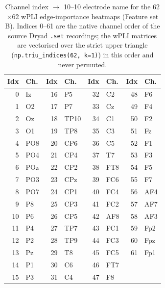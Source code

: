 \begin{table}[t]
  \centering
  \caption{Channel index $\rightarrow$ 10--10 electrode name for the 62$\times$62 wPLI
  edge-importance heatmaps (Feature set B). Indices 0--61 are the native channel order
  of the source Dryad \texttt{.set} recordings; the wPLI matrices are vectorised over the
  strict upper triangle (\texttt{np.triu\_indices(62, k=1)}) in this order and never permuted.}
  \label{tab:wpli-channel-order}
  \begin{tabular}{rlrlrlrl}
    \toprule
    \textbf{Idx} & \textbf{Ch.} & \textbf{Idx} & \textbf{Ch.} & \textbf{Idx} & \textbf{Ch.} & \textbf{Idx} & \textbf{Ch.} \\
    \midrule
    0 & Iz & 16 & P5 & 32 & C2 & 48 & F6 \\
    1 & O2 & 17 & P7 & 33 & Cz & 49 & F4 \\
    2 & Oz & 18 & TP10 & 34 & C1 & 50 & F2 \\
    3 & O1 & 19 & TP8 & 35 & C3 & 51 & Fz \\
    4 & PO8 & 20 & CP6 & 36 & C5 & 52 & F1 \\
    5 & PO4 & 21 & CP4 & 37 & T7 & 53 & F3 \\
    6 & POz & 22 & CP2 & 38 & FT8 & 54 & F5 \\
    7 & PO3 & 23 & CPz & 39 & FC6 & 55 & F7 \\
    8 & PO7 & 24 & CP1 & 40 & FC4 & 56 & AF4 \\
    9 & P8 & 25 & CP3 & 41 & FC2 & 57 & AF7 \\
    10 & P6 & 26 & CP5 & 42 & AF8 & 58 & AF3 \\
    11 & P4 & 27 & TP7 & 43 & FC1 & 59 & Fp2 \\
    12 & P2 & 28 & TP9 & 44 & FC3 & 60 & Fpz \\
    13 & Pz & 29 & T8 & 45 & FC5 & 61 & Fp1 \\
    14 & P1 & 30 & C6 & 46 & FT7 &  &  \\
    15 & P3 & 31 & C4 & 47 & F8 &  &  \\
    \bottomrule
  \end{tabular}
\end{table}

